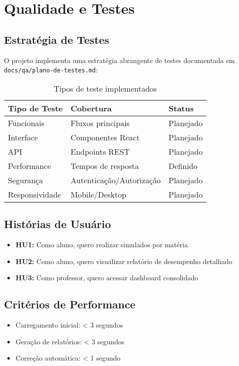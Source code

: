 \documentclass[12pt,a4paper]{article}
\begin{document}
\section{Qualidade e Testes}

\subsection{Estratégia de Testes}
O projeto implementa uma estratégia abrangente de testes documentada em \texttt{docs/qa/plano-de-testes.md}:

\begin{table}[H]
\centering
\begin{tabular}{|l|l|l|}
\hline
\textbf{Tipo de Teste} & \textbf{Cobertura} & \textbf{Status} \\
\hline
Funcionais & Fluxos principais & Planejado \\
Interface & Componentes React & Planejado \\
API & Endpoints REST & Planejado \\
Performance & Tempos de resposta & Definido \\
Segurança & Autenticação/Autorização & Planejado \\
Responsividade & Mobile/Desktop & Planejado \\
\hline
\end{tabular}
\caption{Tipos de teste implementados}
\end{table}

\subsection{Histórias de Usuário}
\begin{itemize}
    \item \textbf{HU1:} Como aluno, quero realizar simulados por matéria
    \item \textbf{HU2:} Como aluno, quero visualizar relatório de desempenho detalhado
    \item \textbf{HU3:} Como professor, quero acessar dashboard consolidado
\end{itemize}

\subsection{Critérios de Performance}
\begin{itemize}
    \item Carregamento inicial: < 3 segundos
    \item Geração de relatórios: < 3 segundos
    \item Correção automática: < 1 segundo
\end{itemize}
\end{document}
